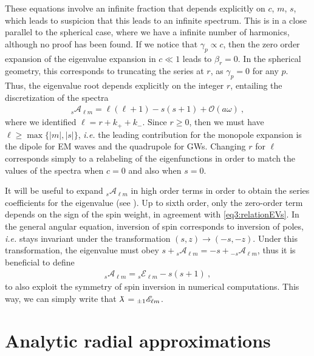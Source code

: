 These equations involve an infinite fraction that depends explicitly on $c$, $m$, $s$, which leads to suspicion that this leads to an infinite spectrum.
This is in a close parallel to the spherical case, where we have a infinite number of harmonics, although no proof has been found.
If we notice that $\gamma_p\propto c$, then the zero order expansion of the eigenvalue expansion in $c\ll 1$ leads to $\beta_r=0$.
In the spherical geometry, this corresponds to truncating the series at $r$, as $\gamma_p=0$ for any $p$. Thus, the eigenvalue root depends explicitly on the integer $r$, entailing the discretization of the spectra
\begin{align}
    \label{eq3:evSWSH0th}
    {}_{s}\mathscr{A}_{\ell m} = \ell(\ell+1) - s(s+1) + \mathscr{O}(a\omega)~,
\end{align}
where we identified $\ell=r+k_{+}+k_{-}$.
Since $r\ge 0$, then we must have $\ell\ge\max\{|m|,|s|\}$, \emph{i.e.} the leading contribution for the monopole expansion is the dipole for EM waves and the quadrupole for GWs. 
Changing $r$ for $\ell$ corresponds simply to a relabeling of the eigenfunctions in order to match the values of the spectra when $c=0$ and also when $s=0$.

It will be useful to expand ${}_{s}\mathscr{A}_{\ell m}$ in high order terms in order to obtain the series coefficients for the eigenvalue (see ).
Up to sixth order, only the zero-order term depends on the sign of the spin weight, in agreement with \eqref{eq3:relationEVs}.
In the general angular equation, inversion of spin corresponds to inversion of poles, \emph{i.e.} stays invariant under the transformation $(s,z)\to(-s,-z)$.
Under this transformation, the eigenvalue must obey $s+ {}_{s}\mathscr{A}_{\ell m} = -s + {}_{-s}\mathscr{A}_{\ell m}$, thus it is beneficial to define 
\begin{align}
    \label{eq3:sElm}
    {}_{s}\mathscr{A}_{\ell m} = {}_{s}\mathscr{E}_{\ell m} - s(s+1) ~,
\end{align}
to also exploit the symmetry of spin inversion in numerical computations.
This way, we can simply write that $\lambdabar={}_{\pm1}\mathscr{E}_{\ell m}$.


\section{Analytic radial approximations}

